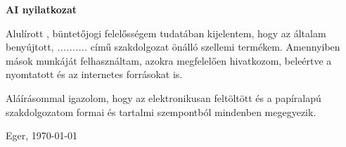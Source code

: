 \begin{center}
    \huge \textbf{AI nyilatkozat}
\end{center}

Alulírott \emph{\@authorname}, büntetőjogi felelősségem tudatában kijelentem, hogy az általam benyújtott, \emph{..........} című szakdolgozat önálló szellemi termékem. Amennyiben mások munkáját felhasználtam, azokra megfelelően hivatkozom, beleértve a nyomtatott és az internetes forrásokat is.

Aláírásommal igazolom, hogy az elektronikusan feltöltött és a papíralapú szakdolgozatom formai és tartalmi szempontból mindenben megegyezik.

\bigskip
\begin{flushleft}
Eger, \today
\end{flushleft}
